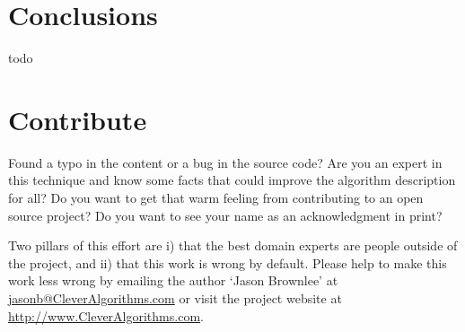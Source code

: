 \documentclass[a4paper, 11pt]{article}
\makeatletter
\newcommand{\myreportauthor}{Jason Brownlee}
\newcommand{\myreportemail}{jasonb@CleverAlgorithms.com}
\newcommand{\myreportwebsite}{http://www.CleverAlgorithms.com}
\makeatother
\begin{document}
% 
% 
\section{Conclusions}
\label{sec:conclusions}
todo

% 
% 
\section{Contribute}
\label{sec:contribute}
Found a typo in the content or a bug in the source code? 
Are you an expert in this technique and know some facts that could improve the algorithm description for all?
Do you want to get that warm feeling from contributing to an open source project? 
Do you want to see your name as an acknowledgment in print?

Two pillars of this effort are i) that the best domain experts are people outside of the project, and ii) that this work is wrong by default. 
Please help to make this work less wrong by emailing the author `\myreportauthor' at \url{\myreportemail} or visit the project website at \url{\myreportwebsite}.



\end{document}
